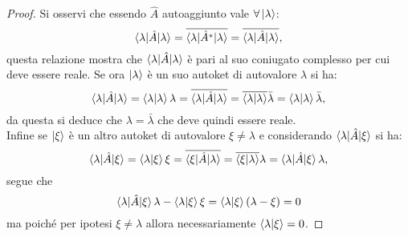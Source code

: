 \begin{proof}
    Si osservi che essendo $\hat A$ autoaggiunto vale $\forall\ket{\lambda}$:
    \begin{equation*}
        \braket{\lambda|\hat A|\lambda}=\overline{\braket{\lambda|\hat A^*|\lambda}}=\overline{\braket{\lambda|\hat A|\lambda}},
    \end{equation*}
    questa relazione mostra che $\braket{\lambda|\hat A|\lambda}$ è pari al suo coniugato complesso per cui deve essere reale.
    Se ora $\ket{\lambda}$ è un suo autoket di autovalore $\lambda$ si ha:
    \begin{equation*}
        \braket{\lambda|\hat A|\lambda}=\braket{\lambda|\lambda}\lambda=\overline{\braket{\lambda|\hat A|\lambda}}=\overline{\braket{\lambda|\lambda}}\bar{\lambda}=\braket{\lambda|\lambda}\bar{\lambda},
    \end{equation*}
       da questa si deduce che $\lambda=\bar{\lambda}$ che deve quindi essere reale.\\
       Infine se $\ket{\xi}$ è un altro autoket di autovalore $\xi\neq\lambda$ e considerando $\braket{\lambda|\hat A|\xi}$ si ha:
       \begin{equation*}
        \braket{\lambda|\hat A|\xi}=\braket{\lambda|\xi}\xi=\overline{\braket{\xi|\hat A|\lambda}}=\overline{\braket{\xi|\lambda}}\lambda=\braket{\lambda|\hat A|\xi}\lambda,
    \end{equation*}
    segue che 
    \begin{equation*}
        \braket{\lambda|\hat A|\xi}\lambda-\braket{\lambda|\xi}\xi=\braket{\lambda|\xi}(\lambda-\xi)=0
    \end{equation*}
    ma poiché per ipotesi $\xi\neq\lambda$ allora necessariamente $\braket{\lambda|\xi}=0$.
\end{proof}
